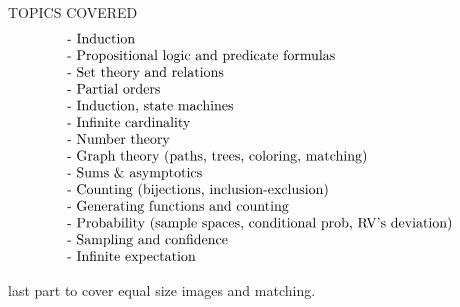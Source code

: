 \documentclass[quiz]{mcs}
\begin{document}
\final

\begin{editingnotes}
TOPICS COVERED
\[\begin{tabular}{lr}
- Induction\\
- Propositional logic and predicate formulas                    \\
- Set theory and relations                                      \\
- Partial orders                                                \\
- Induction, state machines                                     \\
- Infinite cardinality                                          \\
- Number theory                                                 \\
- Graph theory (paths, trees, coloring, matching)               \\
- Sums \& asymptotics                                \\
- Counting (bijections, inclusion-exclusion)               \\
- Generating functions and counting                             \\
- Probability (sample spaces, conditional prob, RV's deviation) \\
- Sampling and  confidence                                     \\
- Infinite expectation
\end{tabular}\]\end{editingnotes}



\examspace
{}

\examspace
\begin{editingnotes}
 last part to cover equal size images and matching.
\end{editingnotes}

\examspace
{}
\end{document}
